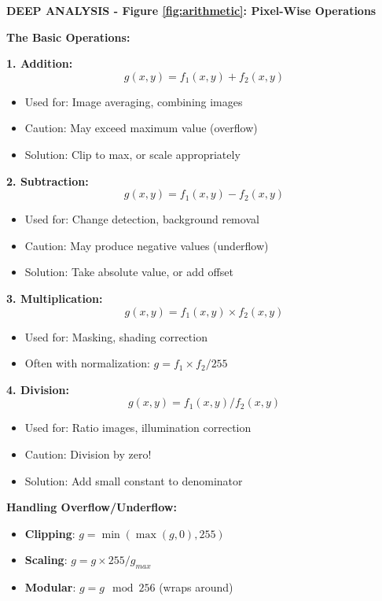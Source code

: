 \documentclass[12pt,a4paper]{article}
\begin{document}
\begin{deepexplanation}
\textbf{DEEP ANALYSIS - Figure \ref{fig:arithmetic}: Pixel-Wise Operations}

\textbf{The Basic Operations:}

\textbf{1. Addition:}
\[
g(x, y) = f_1(x, y) + f_2(x, y)
\]
\begin{itemize}
    \item Used for: Image averaging, combining images
    \item Caution: May exceed maximum value (overflow)
    \item Solution: Clip to max, or scale appropriately
\end{itemize}

\textbf{2. Subtraction:}
\[
g(x, y) = f_1(x, y) - f_2(x, y)
\]
\begin{itemize}
    \item Used for: Change detection, background removal
    \item Caution: May produce negative values (underflow)
    \item Solution: Take absolute value, or add offset
\end{itemize}

\textbf{3. Multiplication:}
\[
g(x, y) = f_1(x, y) \times f_2(x, y)
\]
\begin{itemize}
    \item Used for: Masking, shading correction
    \item Often with normalization: $g = f_1 \times f_2 / 255$
\end{itemize}

\textbf{4. Division:}
\[
g(x, y) = f_1(x, y) / f_2(x, y)
\]
\begin{itemize}
    \item Used for: Ratio images, illumination correction
    \item Caution: Division by zero!
    \item Solution: Add small constant to denominator
\end{itemize}

\textbf{Handling Overflow/Underflow:}
\begin{itemize}
    \item \textbf{Clipping}: $g = \min(\max(g, 0), 255)$
    \item \textbf{Scaling}: $g = g \times 255 / g_{max}$
    \item \textbf{Modular}: $g = g \mod 256$ (wraps around)
\end{itemize}
\end{deepexplanation}
\end{document}
